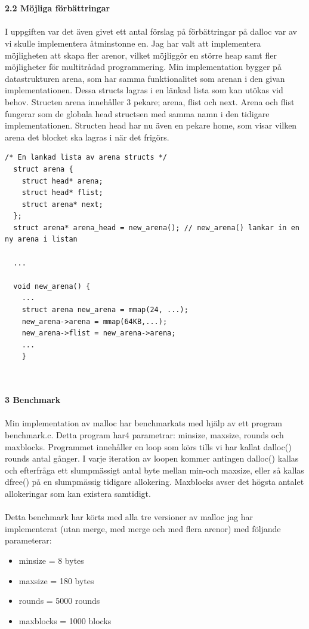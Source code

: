 \documentclass[a4paper,10pt]{article}
\begin{document}
\maketitle
\textbf
{\\\\2.2 Möjliga förbättringar\\\\}
I uppgiften var det även givet ett antal förslag på förbättringar på dalloc var av vi skulle implementera åtminstonne en. Jag har valt att implementera möjligheten att skapa fler arenor, vilket möjliggör en större heap samt fler möjligheter för multitrådad programmering.  Min implementation bygger på datastrukturen arena, som har samma funktionalitet som arenan i den givan implementationen. Dessa structs lagras i en länkad lista som kan utökas vid behov. Structen arena innehåller 3 pekare; arena, flist och next. Arena och flist fungerar som de globala head structsen med samma namn i den tidigare implementationen. Structen head har nu även en pekare home, som visar vilken arena det blocket ska lagras i när det frigörs.
\begin{lstlisting}[style=CStyle]
  /* En lankad lista av arena structs */
  struct arena {
    struct head* arena;
    struct head* flist;
    struct arena* next;
  };
  struct arena* arena_head = new_arena(); // new_arena() lankar in en ny arena i listan

  ...

  void new_arena() {
    ...
    struct arena new_arena = mmap(24, ...);
    new_arena->arena = mmap(64KB,...);
    new_arena->flist = new_arena->arena;
    ...
    }

\end{lstlisting}
 

\maketitle
\textbf
{\\\\3 Benchmark\\\\}
Min implementation av malloc har benchmarkats med hjälp av ett program benchmark.c. Detta program har4 parametrar: minsize, maxsize, rounds och maxblocks. Programmet innehåller en loop som körs tills vi har kallat dalloc() rounds antal gånger. I varje iteration av loopen kommer antingen dalloc() kallas och efterfråga ett slumpmässigt antal byte mellan min-och maxsize, eller så kallas dfree() på en slumpmässig tidigare allokering. Maxblocks avser det högsta antalet allokeringar som kan existera samtidigt. \\\\
Detta benchmark har körts med alla tre versioner av malloc jag har implementerat (utan merge, med merge och med flera arenor) med följande parameterar:
\begin{itemize}
  \item minsize = 8 bytes
  \item maxsize = 180 bytes
  \item rounds = 5000 rounds
  \item maxblocks = 1000 blocks
\end{itemize}
\end{document}

